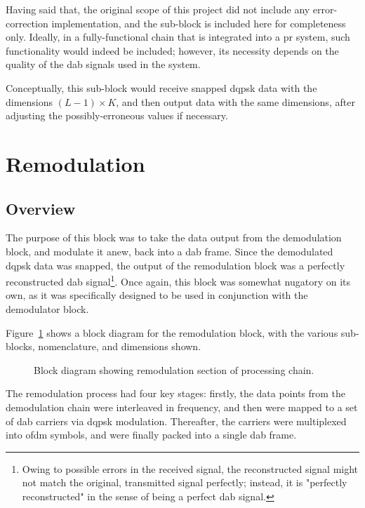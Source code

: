 \documentclass[class=report,11pt,crop=false]{standalone}
\begin{document}
Having said that, the original scope of this project did not include any error-correction implementation, and the sub-block is included here for completeness only. Ideally, in a fully-functional chain that is integrated into a \gls{pr} system, such functionality would indeed be included; however, its necessity depends on the quality of the \gls{dab} signals used in the system.

Conceptually, this sub-block would receive snapped \gls{dqpsk} data with the dimensions \((L-1)\times K\), and then output data with the same dimensions, after adjusting the possibly-erroneous values if necessary.

\section{Remodulation \label{sect:dab-proc_remodulate}}

\subsection{Overview}
The purpose of this block was to take the data output from the demodulation block, and modulate it anew, back into a \gls{dab} frame. Since the demodulated \gls{dqpsk} data was snapped, the output of the remodulation block was a perfectly reconstructed \gls{dab} signal\footnote{Owing to possible errors in the received signal, the reconstructed signal might not match the original, transmitted signal perfectly; instead, it is "perfectly reconstructed" in the sense of being a perfect \gls{dab} signal.}. Once again, this block was somewhat nugatory on its own, as it was specifically designed to be used in conjunction with the demodulator block.

Figure~\ref{fig:BD_Remod_All} shows a block diagram for the remodulation block, with the various sub-blocks, nomenclature, and dimensions shown.

\begin{figure}[htbp]
    \centering
    \captionsetup{type=figure}
    \def\svgwidth{\linewidth}
    { %
        }
    \caption{Block diagram showing remodulation section of processing chain.}
    \label{fig:BD_Remod_All}
\end{figure}

The remodulation process had four key stages: firstly, the data points from the demodulation chain were interleaved in frequency, and then were mapped to a set of \gls{dab} carriers via \gls{dqpsk} modulation. Thereafter, the carriers were multiplexed into \gls{ofdm} symbols, and were finally packed into a single \gls{dab} frame.
\end{document}
